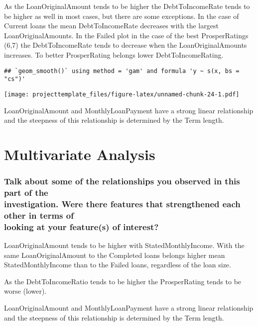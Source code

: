 \documentclass[]{article}
\begin{document}
As the LoanOriginalAmount tends to be higher the DebtToIncomeRate tends
to be higher as well in most cases, but there are some exceptions. In
the case of Current loans the mean DebtToIncomeRate decreases with the
largest LoanOriginalAmounts. In the Failed plot in the case of the best
ProsperRatings (6,7) the DebtToIncomeRate tends to decrease when the
LoanOriginalAmounts increases. To better ProsperRating belongs lower
DebtToIncomeRating.

\begin{verbatim}
## `geom_smooth()` using method = 'gam' and formula 'y ~ s(x, bs = "cs")'
\end{verbatim}

\texttt{[image: projecttemplate\_files/figure-latex/unnamed-chunk-24-1.pdf]}

LoanOriginalAmount and MonthlyLoanPayment have a strong linear
relationship and the steepness of this relationship is determined by the
Term length.

\section{Multivariate Analysis}\label{multivariate-analysis}

\subsubsection{\texorpdfstring{Talk about some of the relationships you
observed in this part of the\\
investigation. Were there features that strengthened each other in terms
of\\
looking at your feature(s) of
interest?}{Talk about some of the relationships you observed in this part of the investigation. Were there features that strengthened each other in terms of looking at your feature(s) of interest?}}\label{talk-about-some-of-the-relationships-you-observed-in-this-part-of-the-investigation.-were-there-features-that-strengthened-each-other-in-terms-of-looking-at-your-features-of-interest}

LoanOriginalAmount tends to be higher with StatedMonthlyIncome. With the
same LoanOriginalAmount to the Completed loans belongs higher mean
StatedMonthlyIncome than to the Failed loans, regardless of the loan
size.

As the DebtToIncomeRatio tends to be higher the ProsperRating tends to
be worse (lower).

LoanOriginalAmount and MonthlyLoanPayment have a strong linear
relationship and the steepness of this relationship is determined by the
Term length.
\end{document}
